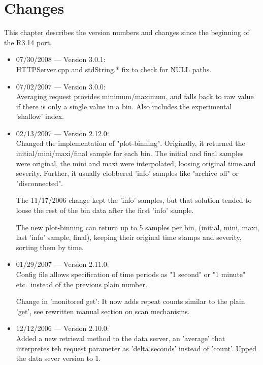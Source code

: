\chapter{Changes}

This chapter describes the version numbers and changes since
the beginning of the R3.14 port.

\begin{itemize}

\item 07/30/2008 --- Version 3.0.1:\\
HTTPServer.cpp and stdString.* fix to check for NULL paths.

\item 07/02/2007 --- Version 3.0.0:\\
Averaging request provides minimum/maximum, and falls back to raw value
if there is only a single value in a bin.
Also includes the experimental 'shallow' index.

\item 02/13/2007 --- Version 2.12.0:\\
Changed the implementation of "plot-binning".
Originally, it returned the initial/mini/maxi/final sample for each bin.
The initial and final samples were original, the mini and maxi were
interpolated, loosing original time and severity.
Further, it usually clobbered 'info' samples like "archive off" or
"disconnected".

The 11/17/2006 change kept the 'info' samples, but that solution
tended to loose the rest of the bin data after the first 'info' sample.

The new plot-binning can return up to 5 samples per bin,
(initial, mini, maxi, last 'info' sample, final), keeping their original
time stamps and severity, sorting them by time.

\item 01/29/2007 --- Version 2.11.0:\\
Config file allows specification of time periods as "1 second" or "1 minute"
etc.\ instead of the previous plain number.

Change in 'monitored get': It now adds repeat counts similar to
the plain 'get', see rewritten manual section on scan mechanisms.

\item 12/12/2006 --- Version 2.10.0:\\
Added a new retrieval method to the data server,
an 'average' that interpretes teh request parameter
as 'delta seconds' instead of 'count'.
Upped the data sever version to 1.


\end{itemize}
